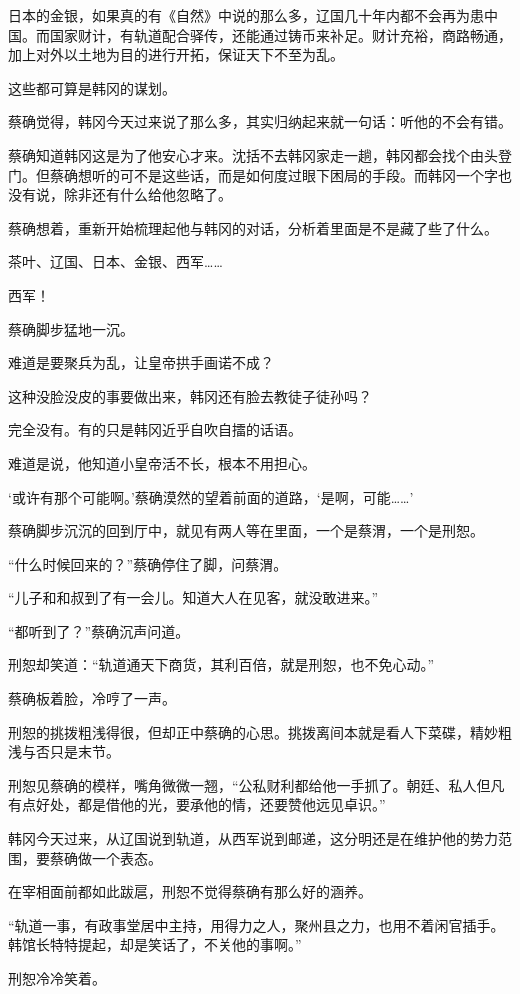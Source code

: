 日本的金银，如果真的有《自然》中说的那么多，辽国几十年内都不会再为患中国。而国家财计，有轨道配合驿传，还能通过铸币来补足。财计充裕，商路畅通，加上对外以土地为目的进行开拓，保证天下不至为乱。

这些都可算是韩冈的谋划。

蔡确觉得，韩冈今天过来说了那么多，其实归纳起来就一句话：听他的不会有错。

蔡确知道韩冈这是为了他安心才来。沈括不去韩冈家走一趟，韩冈都会找个由头登门。但蔡确想听的可不是这些话，而是如何度过眼下困局的手段。而韩冈一个字也没有说，除非还有什么给他忽略了。

蔡确想着，重新开始梳理起他与韩冈的对话，分析着里面是不是藏了些了什么。

茶叶、辽国、日本、金银、西军……

西军！

蔡确脚步猛地一沉。

难道是要聚兵为乱，让皇帝拱手画诺不成？

这种没脸没皮的事要做出来，韩冈还有脸去教徒子徒孙吗？

完全没有。有的只是韩冈近乎自吹自擂的话语。

难道是说，他知道小皇帝活不长，根本不用担心。

‘或许有那个可能啊。’蔡确漠然的望着前面的道路，‘是啊，可能……’

蔡确脚步沉沉的回到厅中，就见有两人等在里面，一个是蔡渭，一个是刑恕。

“什么时候回来的？”蔡确停住了脚，问蔡渭。

“儿子和和叔到了有一会儿。知道大人在见客，就没敢进来。”

“都听到了？”蔡确沉声问道。

刑恕却笑道：“轨道通天下商货，其利百倍，就是刑恕，也不免心动。”

蔡确板着脸，冷哼了一声。

刑恕的挑拨粗浅得很，但却正中蔡确的心思。挑拨离间本就是看人下菜碟，精妙粗浅与否只是末节。

刑恕见蔡确的模样，嘴角微微一翘，“公私财利都给他一手抓了。朝廷、私人但凡有点好处，都是借他的光，要承他的情，还要赞他远见卓识。”

韩冈今天过来，从辽国说到轨道，从西军说到邮递，这分明还是在维护他的势力范围，要蔡确做一个表态。

在宰相面前都如此跋扈，刑恕不觉得蔡确有那么好的涵养。

“轨道一事，有政事堂居中主持，用得力之人，聚州县之力，也用不着闲官插手。韩馆长特特提起，却是笑话了，不关他的事啊。”

刑恕冷冷笑着。

